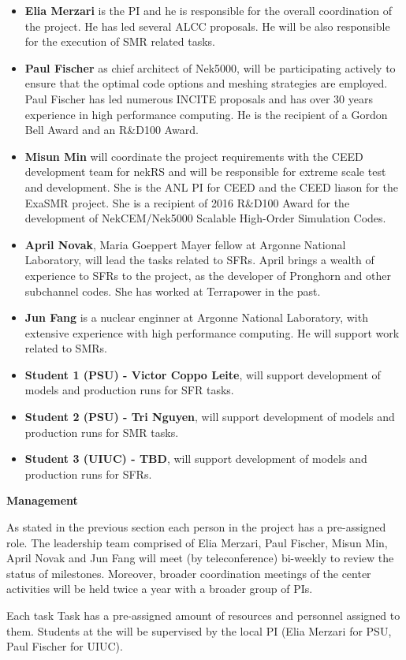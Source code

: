 \documentclass[11pt,letterpaper,english]{article}
\begin{document}
\begin{flushleft}
\vspace{-.15in}
\begin{itemize}
\item \textbf{Elia Merzari} is the PI and he is responsible for the overall coordination of the project. He has led several ALCC proposals. He will be also responsible for the execution of SMR related tasks.
\item \textbf{Paul Fischer} as chief architect of Nek5000, will  be  participating actively to ensure that the optimal code options and meshing strategies are employed. Paul Fischer has led numerous INCITE proposals and has over 30 years experience in high performance computing. He is the recipient of a Gordon Bell Award and an R\&D100 Award.
\item \textbf{Misun Min} will coordinate the project requirements with the CEED development team for nekRS and will be responsible for extreme scale test and development.
She is the ANL PI for CEED and the CEED liason for the ExaSMR project. She is a recipient of 2016 R\&D100 Award for the development of NekCEM/Nek5000 Scalable High-Order Simulation Codes.
\item \textbf{April Novak}, Maria Goeppert Mayer fellow at Argonne National Laboratory, will lead the tasks related to SFRs. April brings a wealth of experience to SFRs to the project, as the developer of Pronghorn and other subchannel codes. She has worked at Terrapower in the past.
\item \textbf{Jun Fang} is a nuclear enginner at Argonne National Laboratory, with extensive experience with high performance computing.  He will support work related to SMRs.
\item \textbf{Student 1 (PSU) - Victor Coppo Leite}, will support development of models and production runs for SFR tasks.
\item \textbf{Student 2 (PSU) - Tri Nguyen}, will support development of models and production runs for SMR tasks.
\item \textbf{Student 3 (UIUC) - TBD}, will support development of models and production runs for SFRs.
\end{itemize}

{\noindent \bf  {Management}}

As stated in the previous section each person in the project has a pre-assigned role. The leadership team comprised of Elia Merzari, Paul Fischer, Misun Min, April Novak and Jun Fang will meet (by teleconference) bi-weekly to review the status of milestones.  Moreover, broader coordination meetings of the center activities will be held twice a year with a broader group of PIs.

Each task Task has a pre-assigned amount of resources and personnel assigned to them. Students at the  will be supervised by the local PI (Elia Merzari for PSU, Paul Fischer for UIUC).

\end{flushleft}
\end{document}
